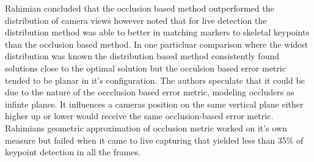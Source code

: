 Rahimian concluded that the occlusion based method outperformed the distribution of camera views however noted that for live detection the distribution method was able to better in matching markers to skeletal keypoints than the occlusion based method.
In one particluar comparison where the widest distribution was known the distribution based method consistently found solutions close to the optimal solution but the occulsion based error metric tended to be planar in it's configuration. The authors speculate that it could be due to the nature of the occclusion based error metric, modeling occluders as infinte planes. It influences a cameras position on the same vertical plane either higher up or lower would receive the same occlusion-based error metric.
Rahimians geometric approximation of occlusion metric worked on it's own measure but failed when it came to live capturing that yielded less than 35\% of keypoint detection in all the frames.


